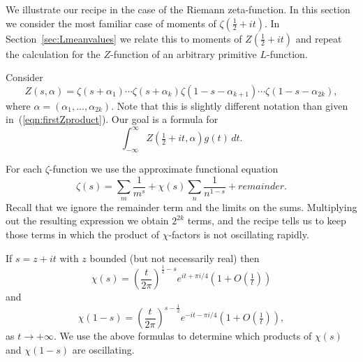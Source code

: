 \documentclass[12pt,letterpaper]{amsart}
\theoremstyle{plain}
\theoremstyle{definition}
\theoremstyle{remark}
\numberwithin{equation}{subsection}
\numberwithin{theorem}{subsection}
\numberwithin{table}{subsection}
\def\({\left(}
\def\){\right)}
\begin{document}
We illustrate our recipe in the case of the Riemann zeta-function.
In this section we consider the most familiar case of
moments of $\zeta(\frac12+it)$. 
In Section~\ref{sec:Lmeanvalues} we 
relate this to moments of
$Z(\frac12+it)$ and repeat the
calculation for the $Z$-function of an arbitrary primitive
$L$-function.

Consider
\begin{equation}\label{eqn:zetaproduct}
Z(s,\alpha )= \zeta(s+\alpha _1)\cdots \zeta(s+\alpha
_k)\zeta(1-s-\alpha _{k+1})\cdots \zeta(1-s-\alpha _{2k}),
\end{equation}
where $\alpha =(\alpha _1,\ldots, \alpha _{2k})$.
Note that this is slightly different notation than given 
in~(\ref{eqn:firstZproduct}).
Our goal is a formula for
\begin{equation}
\int_{-\infty}^\infty Z(\tfrac12+it,\alpha ) g(t)\, dt.
\end{equation}

For each $\zeta$-function we use the approximate functional equation
\begin{equation}
\zeta(s)=\sum_m \frac{1}{m^s}+\chi(s)\sum_n \frac {1}{n^{1-s}} + remainder.
\end{equation}
Recall that we ignore the remainder term and the limits on the sums.
Multiplying out the resulting expression we obtain $2^{2k}$
terms, and the recipe tells us to keep those terms in which the
product of $\chi$-factors is not oscillating rapidly.  

If $s=z+it$ with $z$ bounded (but not necessarily real) then
\begin{equation}
\chi(s)=\(\frac{t}{2\pi}\)^{\frac12 -s}e^{it+\pi i/4}(1+O(\tfrac{1}{t}))
\label{eqn:chis}
\end{equation}
and
\begin{equation}
\chi(1-s)=\(\frac{t}{2\pi}\)^{s-\frac12 }e^{-it-\pi i/4}(1+O(\tfrac{1}{t})),
\label{eqn:chi1minuss}
\end{equation}
as $t\to+\infty$.
We use the above formulas to determine which products of
$\chi(s)$ and $\chi(1-s)$ are oscillating.
\end{document}

